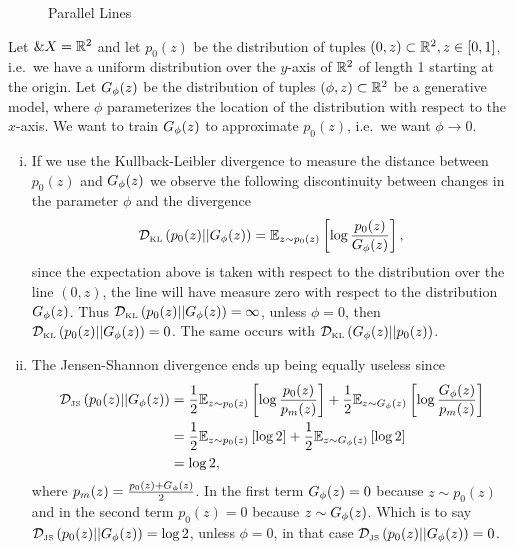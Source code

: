 \begin{example}
  \begin{figure}[h] \centering
    \caption{Parallel Lines}%
    \label{fig:parallel-lines}
  \end{figure}%
  \label{example:learning-parallel-lines}

  Let $\&X = \mathbb{R}^2$ and let $p_0(z)$ be the distribution of tuples
  $(0, z) \subset \mathbb{R}^2, z \in [0, 1]$, i.e.\ we have a uniform
  distribution over the $y$-axis of $\mathbb{R}^2$ of length 1 starting at the
  origin. Let $G_\phi(z)$ be the distribution of tuples
  $(\phi, z) \subset \mathbb{R}^2$ be a generative model, where $\phi$
  parameterizes the location of the distribution with respect to the
  $x$-axis. We want to train $G_\phi(z)$ to approximate $p_0(z)$, i.e.\ we
  want $\phi \to 0$.
  \begin{enumerate}[(i)]
  \item If we use the Kullback-Leibler divergence to measure the
    distance between $p_0(z)$ and $G_\phi(z)$ we observe the following
    discontinuity between changes in the parameter $\phi$ and the
    divergence
    \begin{align}
      \mathcal{D}_{\text{\tiny KL}}\left( p_0(z) \middle| \middle| G_\phi(z) \right) = \mathbb{E}_{z \sim p_0(z)}\left[ \log{p_0(z)\over G_\phi(z)} \right],
    \end{align}
    since the expectation above is taken with respect to the
    distribution over the line $(0, z)$, the line will have measure
    zero with respect to the distribution $G_\phi(z)$. Thus
    $\mathcal{D}_{\text{\tiny KL}}\left( p_0(z) \middle| \middle| G_\phi(z) \right) = \infty$, unless $\phi = 0$, then
    $\mathcal{D}_{\text{\tiny KL}}\left( p_0(z) \middle| \middle| G_\phi(z) \right) = 0$. The same occurs with
    $\mathcal{D}_{\text{\tiny KL}}\left( G_\phi(z) \middle| \middle| p_0(z) \right)$.
  \item The Jensen-Shannon divergence ends up being equally useless
    since
    \begin{align}
      \mathcal{D}_{\text{\tiny JS}}\left(p_0(z)\middle|\middle|G_\phi(z)\right) & = {1 \over 2} \mathbb{E}_{z \sim p_0(z)}\left[ \log{p_0(z)
                            \over p_m(z)} \right] + {1 \over 2} \mathbb{E}_{z \sim
                            G_\phi(z)}\left[ \log{G_\phi(z) \over p_m(z)} \right] \\
                          & = {1 \over 2} \mathbb{E}_{z \sim p_0(z)}\left[ \log{2} \right] + {1
                            \over 2} \mathbb{E}_{z \sim G_\phi(z)}\left[ \log{2} \right] \\
                          & = \log{2},
    \end{align}
    where $p_m(z) = {p_0(z) + G_\phi(z) \over 2}$. In the first term
    $G_\phi(z) = 0$ because $z \sim p_0(z)$ and in the second term
    $p_0(z) = 0$ because $z \sim G_\phi(z)$. Which is to say
    $\mathcal{D}_{\text{\tiny JS}}\left(p_0(z)\middle|\middle|G_\phi(z)\right) = \log{2}$, unless $\phi = 0$, in that case
    $\mathcal{D}_{\text{\tiny JS}}\left(p_0(z)\middle|\middle|G_\phi(z)\right) = 0$.
  \end{enumerate}
\end{example}

